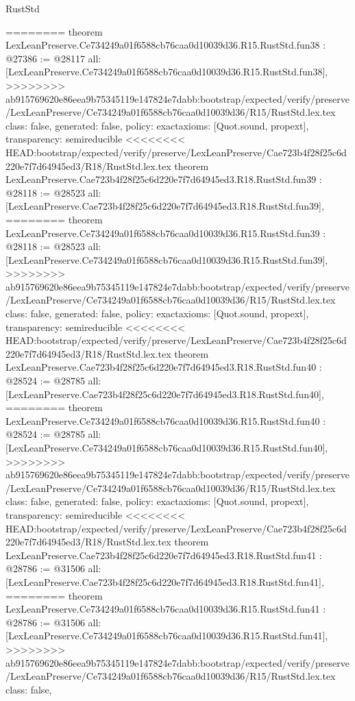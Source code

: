 \begin{lexlean}{RustStd}
\begin{coremodule}
{\begin{coremodule}
{{{{{{{{{{{{{{{{{{{{{{{{{{{{{{{{{{{{{{{{{========
theorem LexLeanPreserve.Ce734249a01f6588cb76caa0d10039d36.R15.RustStd.fun38 : @27386 := @28117 {
  all: [LexLeanPreserve.Ce734249a01f6588cb76caa0d10039d36.R15.RustStd.fun38],
>>>>>>>> ab915769620e86eea9b75345119e147824e7dabb:bootstrap/expected/verify/preserve/LexLeanPreserve/Ce734249a01f6588cb76caa0d10039d36/R15/RustStd.lex.tex
  class: false,
  generated: false,
  policy: exact{axioms: [Quot.sound, propext]},
  transparency: semireducible
}
<<<<<<<< HEAD:bootstrap/expected/verify/preserve/LexLeanPreserve/Cae723b4f28f25c6d220e7f7d64945ed3/R18/RustStd.lex.tex
theorem LexLeanPreserve.Cae723b4f28f25c6d220e7f7d64945ed3.R18.RustStd.fun39 : @28118 := @28523 {
  all: [LexLeanPreserve.Cae723b4f28f25c6d220e7f7d64945ed3.R18.RustStd.fun39],
========
theorem LexLeanPreserve.Ce734249a01f6588cb76caa0d10039d36.R15.RustStd.fun39 : @28118 := @28523 {
  all: [LexLeanPreserve.Ce734249a01f6588cb76caa0d10039d36.R15.RustStd.fun39],
>>>>>>>> ab915769620e86eea9b75345119e147824e7dabb:bootstrap/expected/verify/preserve/LexLeanPreserve/Ce734249a01f6588cb76caa0d10039d36/R15/RustStd.lex.tex
  class: false,
  generated: false,
  policy: exact{axioms: [Quot.sound, propext]},
  transparency: semireducible
}
<<<<<<<< HEAD:bootstrap/expected/verify/preserve/LexLeanPreserve/Cae723b4f28f25c6d220e7f7d64945ed3/R18/RustStd.lex.tex
theorem LexLeanPreserve.Cae723b4f28f25c6d220e7f7d64945ed3.R18.RustStd.fun40 : @28524 := @28785 {
  all: [LexLeanPreserve.Cae723b4f28f25c6d220e7f7d64945ed3.R18.RustStd.fun40],
========
theorem LexLeanPreserve.Ce734249a01f6588cb76caa0d10039d36.R15.RustStd.fun40 : @28524 := @28785 {
  all: [LexLeanPreserve.Ce734249a01f6588cb76caa0d10039d36.R15.RustStd.fun40],
>>>>>>>> ab915769620e86eea9b75345119e147824e7dabb:bootstrap/expected/verify/preserve/LexLeanPreserve/Ce734249a01f6588cb76caa0d10039d36/R15/RustStd.lex.tex
  class: false,
  generated: false,
  policy: exact{axioms: [Quot.sound, propext]},
  transparency: semireducible
}
<<<<<<<< HEAD:bootstrap/expected/verify/preserve/LexLeanPreserve/Cae723b4f28f25c6d220e7f7d64945ed3/R18/RustStd.lex.tex
theorem LexLeanPreserve.Cae723b4f28f25c6d220e7f7d64945ed3.R18.RustStd.fun41 : @28786 := @31506 {
  all: [LexLeanPreserve.Cae723b4f28f25c6d220e7f7d64945ed3.R18.RustStd.fun41],
========
theorem LexLeanPreserve.Ce734249a01f6588cb76caa0d10039d36.R15.RustStd.fun41 : @28786 := @31506 {
  all: [LexLeanPreserve.Ce734249a01f6588cb76caa0d10039d36.R15.RustStd.fun41],
>>>>>>>> ab915769620e86eea9b75345119e147824e7dabb:bootstrap/expected/verify/preserve/LexLeanPreserve/Ce734249a01f6588cb76caa0d10039d36/R15/RustStd.lex.tex
  class: false,
}}}}}}}}}}}}}}}}}}}}}}}}}}}}}}}}}}}}}}}}}}}}}
\end{coremodule}}
\end{coremodule}
\end{lexlean}
